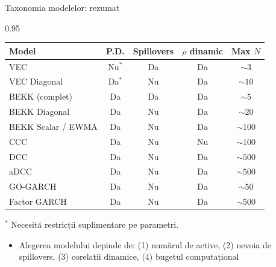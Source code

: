\documentclass[9pt, aspectratio=169, t]{beamer}
\begin{document}
\begin{frame}{Taxonomia modelelor: rezumat}
    \begin{cminipage}{0.95\textwidth}
    {\scriptsize
    \begin{center}
    \begin{tabular}{lcccc}
        \hline
        \textbf{Model} & \textbf{P.D.} & \textbf{Spillovers} & \textbf{$\rho$ dinamic} & \textbf{Max $N$} \\
        \hline
        VEC & Nu$^*$ & Da & Da & $\sim 3$ \\
        VEC Diagonal & Da$^*$ & Nu & Da & $\sim 10$ \\
        BEKK (complet) & Da & Da & Da & $\sim 5$ \\
        BEKK Diagonal & Da & Nu & Da & $\sim 20$ \\
        BEKK Scalar / EWMA & Da & Nu & Da & $\sim 100$ \\
        CCC & Da & Nu & Nu & $\sim 100$ \\
        DCC & Da & Nu & Da & $\sim 500$ \\
        aDCC & Da & Nu & Da & $\sim 500$ \\
        GO-GARCH & Da & Nu & Da & $\sim 50$ \\
        Factor GARCH & Da & Nu & Da & $\sim 500$ \\
        \hline
    \end{tabular}
    \end{center}
    \vspace{0.1cm}
    $^*$ Necesită restricții suplimentare pe parametri.
    }
    \begin{alertblock}{}
        {\footnotesize
        \begin{itemize}\setlength{\itemsep}{0pt}
            \item Alegerea modelului depinde de: (1) numărul de active, (2) nevoia de spillovers, (3) corelații dinamice, (4) bugetul computațional
        \end{itemize}
        }
    \end{alertblock}
    \end{cminipage}
\end{frame}
\end{document}
